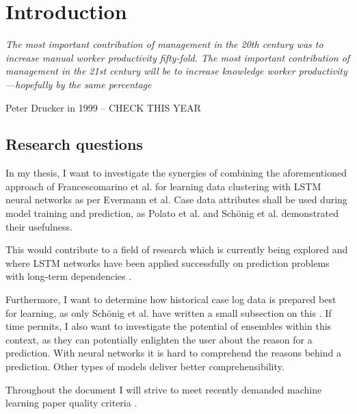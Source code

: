 \chapter{Introduction}\label{sec:intro}
\setlength{\epigraphwidth}{0.9\textwidth}
\renewcommand{\epigraphrule}{0pt}
\epigraph{\textit{The most important contribution of management in the 20th century was to increase manual worker productivity fifty-fold. The most important contribution of management in the 21st century will be to increase knowledge worker productivity—hopefully by the same percentage}}{Peter Drucker in 1999 -- CHECK THIS YEAR}

\lipsum[1-4]

\section{Research questions}\label{sec:intro:objective}

In my thesis, I want to investigate the synergies of combining the aforementioned approach of Francescomarino et al. for learning data clustering with LSTM neural networks as per Evermann et al. Case data attributes shall be used during model training and prediction, as Polato et al. \cite{polato2014} and Schönig et al. \cite{schoenig2018} demonstrated their usefulness.

This would contribute to a field of research which is currently being explored and where LSTM networks have been applied successfully on prediction problems with long-term dependencies \cite{evermann2016, tax2017, schoenig2018, graves2005}.

Furthermore, I want to determine how historical case log data is prepared best for learning, as only Schönig et al. have written a small subsection on this \cite{schoenig2018}.
If time permits, I also want to investigate the potential of ensembles within this context, as they can potentially enlighten the user about the reason for a prediction.
With neural networks it is hard to comprehend the reasons behind a prediction.
Other types of models deliver better comprehensibility.

Throughout the document I will strive to meet recently demanded machine learning paper quality criteria \cite{lipton2018}.

